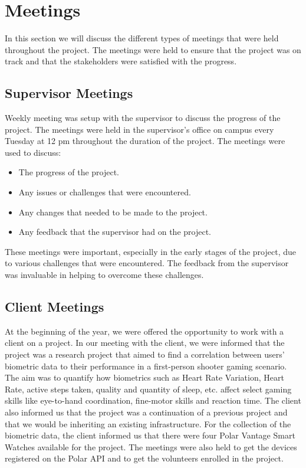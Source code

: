 \section{Meetings}
In this section we will discuss the different types of meetings that were held throughout the project. The meetings were held to ensure that the project was on track
and that the stakeholders were satisfied with the progress.

\subsection{Supervisor Meetings}
Weekly meeting was setup with the supervisor to discuss the progress of the project. The meetings were held in the supervisor's office on campus every Tuesday at 12 pm throughout
the duration of the project. The meetings were used to discuss:

\begin{itemize}
    \item The progress of the project.
    \item Any issues or challenges that were encountered.
    \item Any changes that needed to be made to the project.
    \item Any feedback that the supervisor had on the project.
\end{itemize}

These meetings were important, especially in the early stages of the project, due to various challenges that were encountered. The feedback from the supervisor was invaluable
in helping to overcome these challenges.

\subsection{Client Meetings}

At the beginning of the year, we were offered the opportunity to work with a client on a project. In our meeting with the client, we were informed that the project
was a research project that aimed to find a correlation between users' biometric data to their performance in a first-person shooter gaming scenario. The aim was to quantify
how biometrics such as Heart Rate Variation, Heart Rate, active steps taken, quality and quantity of sleep, etc. affect select gaming skills like eye-to-hand coordination, fine-motor skills and reaction time.
The client also informed us that the project was a continuation of a previous project and that we would be inheriting an existing infrastructure. 
For the collection of the biometric data, the client informed us that there were four Polar Vantage Smart Watches available for the project. The meetings were also held to get
the devices registered on the Polar API and to get the volunteers enrolled in the project. 

